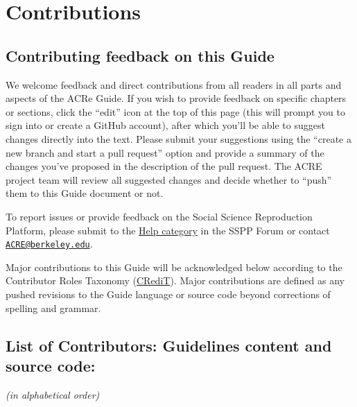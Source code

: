 \documentclass[
  openany]{book}
\begin{document}
\hypertarget{contributions}{%
\chapter{Contributions}\label{contributions}}

\hypertarget{contrib-guide}{%
\section{Contributing feedback on this Guide}\label{contrib-guide}}

We welcome feedback and direct contributions from all readers in all parts and aspects of the ACRe Guide. If you wish to provide feedback on specific chapters or sections, click the ``edit'' icon at the top of this page (this will prompt you to sign into or create a GitHub account), after which you'll be able to suggest changes directly into the text. Please submit your suggestions using the ``create a new branch and start a pull request'' option and provide a summary of the changes you've proposed in the description of the pull request. The ACRE project team will review all suggested changes and decide whether to ``push'' them to this Guide document or not.

To report issues or provide feedback on the Social Science Reproduction Platform, please submit to the \href{https://forum.socialsciencereproduction.org/c/help/8}{Help category} in the SSPP Forum or contact \href{mailto:ACRE@berkeley.edu}{\nolinkurl{ACRE@berkeley.edu}}.

Major contributions to this Guide will be acknowledged below according to the Contributor Roles Taxonomy (\href{https://casrai.org/credit/}{CRediT}). Major contributions are defined as any pushed revisions to the Guide language or source code beyond corrections of spelling and grammar.

\hypertarget{list-of-contributors-guidelines-content-and-source-code}{%
\section{List of Contributors: Guidelines content and source code:}\label{list-of-contributors-guidelines-content-and-source-code}}

\emph{(in alphabetical order)}
\end{document}
